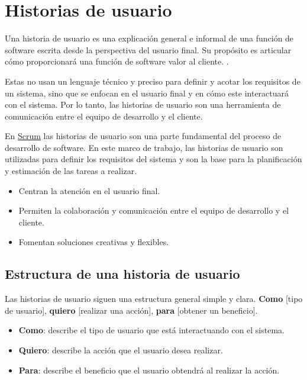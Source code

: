 \section{Historias de usuario}

Una historia de usuario es una explicación general e informal de una función de software escrita desde la perspectiva
del usuario final. Su propósito es articular cómo proporcionará una función de software valor al cliente. \cite{atlassian_user_stories}.

Estas no usan un lenguaje técnico y preciso para definir y acotar los requisitos de un sistema, sino que se enfocan en
el usuario final y en cómo este interactuará con el sistema. Por lo tanto, las historias de usuario son una herramienta
de comunicación entre el equipo de desarrollo y el cliente.

En \hyperlink{scrum}{Scrum} las historias de usuario son una parte fundamental del proceso de desarrollo de software. En
este marco de trabajo, las historias de usuario son utilizadas para definir los requisitos del sistema y son la base para
la planificación y estimación de las tareas a realizar.
\newline\newline
{}
\begin{itemize}
    \item Centran la atención en el usuario final.
    \item Permiten la colaboración y comunicación entre el equipo de desarrollo y el cliente.
    \item Fomentan soluciones creativas y flexibles.
\end{itemize}
\subsection{Estructura de una historia de usuario}

Las historias de usuario siguen una estructura general simple y clara. 
\newline\newline
\textbf{Como} [tipo de usuario], \textbf{quiero} [realizar una acción], \textbf{para} [obtener un beneficio].

\begin{itemize}
    \item \textbf{Como}: describe el tipo de usuario que está interactuando con el sistema.
    \item \textbf{Quiero}: describe la acción que el usuario desea realizar.
    \item \textbf{Para}: describe el beneficio que el usuario obtendrá al realizar la acción.   
\end{itemize}

